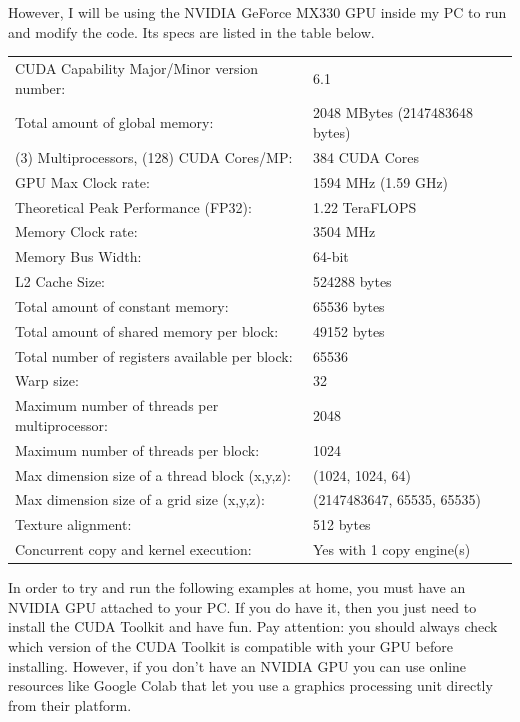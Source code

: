 However, I will be using the NVIDIA GeForce MX330 GPU inside my PC to run and modify the code. Its specs are listed in the table below.

\begin{table}[htbp]
    \centering
    \small
    \begin{tabular}{|ll|}
    \hline
        CUDA Capability Major/Minor version number: & 6.1 \\
        Total amount of global memory: & 2048 MBytes (2147483648 bytes) \\
        (3) Multiprocessors, (128) CUDA Cores/MP: & 384 CUDA Cores \\
        GPU Max Clock rate: & 1594 MHz (1.59 GHz) \\
        Theoretical Peak Performance (FP32): & 1.22 TeraFLOPS \\
        Memory Clock rate: & 3504 MHz \\
        Memory Bus Width: & 64-bit \\
        L2 Cache Size: & 524288 bytes \\
        Total amount of constant memory: & 65536 bytes \\
        Total amount of shared memory per block: & 49152 bytes \\
        Total number of registers available per block: & 65536 \\
        Warp size: & 32 \\
        Maximum number of threads per multiprocessor: & 2048 \\
        Maximum number of threads per block: & 1024 \\
        Max dimension size of a thread block (x,y,z): & (1024, 1024, 64) \\
        Max dimension size of a grid size (x,y,z): & (2147483647, 65535, 65535) \\
        Texture alignment: & 512 bytes \\
        Concurrent copy and kernel execution: & Yes with 1 copy engine(s) \\
    \hline
    \end{tabular}
\end{table}

In order to try and run the following examples at home, you must have an NVIDIA GPU attached to your PC. If you do have it, then you just need to install the CUDA Toolkit and have fun. Pay attention: you should always check which version of the CUDA Toolkit is compatible with your GPU before installing. However, if you don't have an NVIDIA GPU you can use online resources like Google Colab that let you use a graphics processing unit directly from their platform. 

